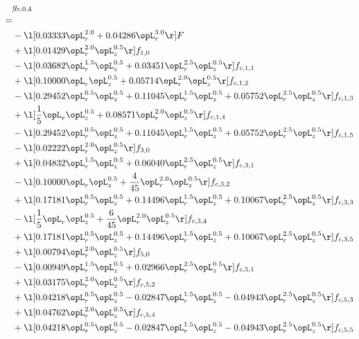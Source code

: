 \begin{alignat}{2} 
\label{eq:g_04_0} 
& g_{c,0,4} \nonumber \\ 
 = \\ 
& - \l[  0.03333 \opL_r^{2.0} +  0.04286 \opL_r^{3.0}  \r] F \nonumber \\ 
& + \l[  0.01429 \opL_r^{2.0} \opL_z^{0.5}  \r] f_{1,0} \nonumber \\ 
& - \l[  0.03682 \opL_r^{1.5} \opL_z^{0.5} +  0.03451 \opL_r^{2.5} \opL_z^{0.5}  \r] f_{c,1,1} \nonumber \\ 
& + \l[  0.10000 \opL_r \opL_z^{0.5} +  0.05714 \opL_r^{2.0} \opL_z^{0.5}  \r] f_{c,1,2} \nonumber \\ 
& - \l[  0.29452 \opL_r^{0.5} \opL_z^{0.5} +  0.11045 \opL_r^{1.5} \opL_z^{0.5} +  0.05752 \opL_r^{2.5} \opL_z^{0.5}  \r] f_{c,1,3} \nonumber \\ 
& + \l[ \frac{1}{5} \opL_r \opL_z^{0.5} +  0.08571 \opL_r^{2.0} \opL_z^{0.5}  \r] f_{c,1,4} \nonumber \\ 
& - \l[  0.29452 \opL_r^{0.5} \opL_z^{0.5} +  0.11045 \opL_r^{1.5} \opL_z^{0.5} +  0.05752 \opL_r^{2.5} \opL_z^{0.5}  \r] f_{c,1,5} \nonumber \\ 
& - \l[  0.02222 \opL_r^{2.0} \opL_z^{0.5}  \r] f_{3,0} \nonumber \\ 
& + \l[  0.04832 \opL_r^{1.5} \opL_z^{0.5} +  0.06040 \opL_r^{2.5} \opL_z^{0.5}  \r] f_{c,3,1} \nonumber \\ 
& - \l[  0.10000 \opL_r \opL_z^{0.5} + \frac{4}{45} \opL_r^{2.0} \opL_z^{0.5}  \r] f_{c,3,2} \nonumber \\ 
& + \l[  0.17181 \opL_r^{0.5} \opL_z^{0.5} +  0.14496 \opL_r^{1.5} \opL_z^{0.5} +  0.10067 \opL_r^{2.5} \opL_z^{0.5}  \r] f_{c,3,3} \nonumber \\ 
& - \l[ \frac{1}{5} \opL_r \opL_z^{0.5} + \frac{6}{45} \opL_r^{2.0} \opL_z^{0.5}  \r] f_{c,3,4} \nonumber \\ 
& + \l[  0.17181 \opL_r^{0.5} \opL_z^{0.5} +  0.14496 \opL_r^{1.5} \opL_z^{0.5} +  0.10067 \opL_r^{2.5} \opL_z^{0.5}  \r] f_{c,3,5} \nonumber \\ 
& + \l[  0.00794 \opL_r^{2.0} \opL_z^{0.5}  \r] f_{5,0} \nonumber \\ 
& - \l[  0.00949 \opL_r^{1.5} \opL_z^{0.5} +  0.02966 \opL_r^{2.5} \opL_z^{0.5}  \r] f_{c,5,1} \nonumber \\ 
& + \l[  0.03175 \opL_r^{2.0} \opL_z^{0.5}  \r] f_{c,5,2} \nonumber \\ 
& + \l[  0.04218 \opL_r^{0.5} \opL_z^{0.5}   -0.02847 \opL_r^{1.5} \opL_z^{0.5}   -0.04943 \opL_r^{2.5} \opL_z^{0.5}  \r] f_{c,5,3} \nonumber \\ 
& + \l[  0.04762 \opL_r^{2.0} \opL_z^{0.5}  \r] f_{c,5,4} \nonumber \\ 
& + \l[  0.04218 \opL_r^{0.5} \opL_z^{0.5}   -0.02847 \opL_r^{1.5} \opL_z^{0.5}   -0.04943 \opL_r^{2.5} \opL_z^{0.5}  \r] f_{c,5,5} \nonumber \\ 
\end{alignat} 



